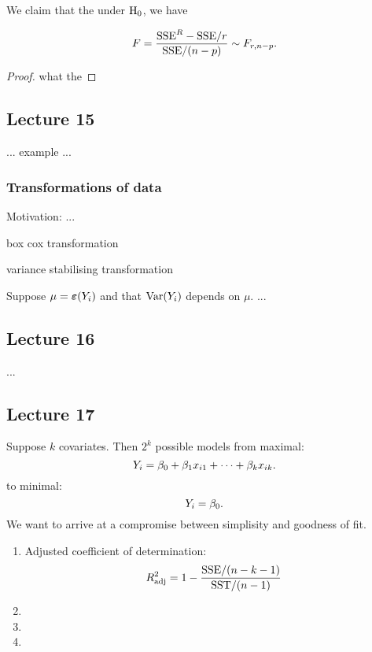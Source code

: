 We claim that the under $\mathrm{H}_0$, we have

$$
    F = \frac{\mathrm{SSE}^R-\mathrm{SSE} / r}{\mathrm{SSE}/(n-p)} \sim F_{r, n-p}.
$$

\begin{proof}
    
    what the

\end{proof}




\subsection*{Lecture 15}


... example ...


\subsubsection*{Transformations of data}
Motivation:
...


box cox transformation
 

variance stabilising transformation

Suppose $\mu=\boldsymbol{\varepsilon}(Y_i)$ and that $\mathrm{Var}(Y_i)$ depends on $\mu$. ...

 

\subsection*{Lecture 16}

...






\subsection*{Lecture 17}
Suppose $k$ covariates. Then $2^k$ possible models from maximal:
$$
    Y_i = \beta_0+\beta_1x_{i1} + \dots + \beta_kx_{ik}.
$$
to minimal:
$$
    Y_i = \beta_0.
$$
We want to arrive at a compromise between simplisity and goodness of fit. 

\begin{enumerate}
    \item Adjusted coefficient of determination:
    $$
        R^2_{\mathrm{adj}} = 1 - \frac{\mathrm{SSE} / (n-k-1)}{\mathrm{SST} / (n-1)}
    $$
    \item 
    \item 
    \item 
\end{enumerate}
  


